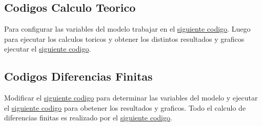 \subsection{Codigos Calculo Teorico}

Para configurar las variables del modelo trabajar en el \href{https://github.com/LukasWolff2002/ENTREGA_3_MCOC/blob/main/CODIGO/CALCULOS_MANUALES/variables.py}{siguiente codigo}. Luego para ejecutar los calculos toricos y obtener los distintos resultados y graficos ejecutar el \href{https://github.com/LukasWolff2002/ENTREGA_3_MCOC/blob/main/CODIGO/CALCULOS_MANUALES/main.py}{siguiente codigo}.

\subsection{Codigos Diferencias Finitas}

Modificar el \href{https://github.com/LukasWolff2002/ENTREGA_3_MCOC/blob/main/CODIGO/LAPLACE/variables.py}{siguiente codigo} para determinar las variables del modelo y ejecutar el \href{https://github.com/LukasWolff2002/ENTREGA_3_MCOC/blob/main/CODIGO/LAPLACE/main.py}{siguiente codigo} para obetener los resultados y graficos. Todo el calculo de diferencias finitas es realizado por el \href{https://github.com/LukasWolff2002/ENTREGA_3_MCOC/blob/main/CODIGO/LAPLACE/laplace_solver.py}{siguiente codigo}. 



    
